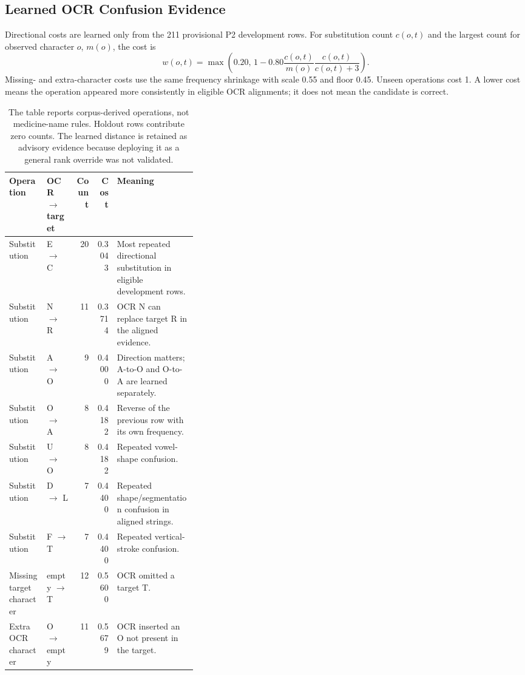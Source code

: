 \documentclass[11pt,a4paper]{article}
\begin{document}
\subsection{Learned OCR Confusion Evidence}

Directional costs are learned only from the 211 provisional P2 development
rows. For substitution count $c(o,t)$ and the largest count for observed
character $o$, $m(o)$, the cost is
\[
w(o,t)=\max\left(0.20,\,
1-0.80\frac{c(o,t)}{m(o)}\frac{c(o,t)}{c(o,t)+3}\right).
\]
Missing- and extra-character costs use the same frequency shrinkage with scale
0.55 and floor 0.45. Unseen operations cost 1. A lower cost means the operation
appeared more consistently in eligible OCR alignments; it does not mean the
candidate is correct.

\begin{table}[htbp]
\centering
\small
\begin{tabularx}{\linewidth}{@{}L{0.20\linewidth}L{0.16\linewidth}rrY@{}}
\toprule
\textbf{Operation} & \textbf{OCR $\rightarrow$ target} & \textbf{Count} &
\textbf{Cost} & \textbf{Meaning} \\
\midrule
Substitution & E $\rightarrow$ C & 20 & 0.3043 & Most repeated directional substitution in eligible development rows. \\
Substitution & N $\rightarrow$ R & 11 & 0.3714 & OCR N can replace target R in the aligned evidence. \\
Substitution & A $\rightarrow$ O & 9 & 0.4000 & Direction matters; A-to-O and O-to-A are learned separately. \\
Substitution & O $\rightarrow$ A & 8 & 0.4182 & Reverse of the previous row with its own frequency. \\
Substitution & U $\rightarrow$ O & 8 & 0.4182 & Repeated vowel-shape confusion. \\
Substitution & D $\rightarrow$ L & 7 & 0.4400 & Repeated shape/segmentation confusion in aligned strings. \\
Substitution & F $\rightarrow$ T & 7 & 0.4400 & Repeated vertical-stroke confusion. \\
Missing target character & empty $\rightarrow$ T & 12 & 0.5600 & OCR omitted a target T. \\
Extra OCR character & O $\rightarrow$ empty & 11 & 0.5679 & OCR inserted an O not present in the target. \\
\bottomrule
\end{tabularx}
\caption{The table reports corpus-derived operations, not medicine-name rules.
Holdout rows contribute zero counts. The learned distance is retained as
advisory evidence because deploying it as a general rank override was not
validated.}
\label{tab:a6-confusions}
\end{table}
\end{document}
